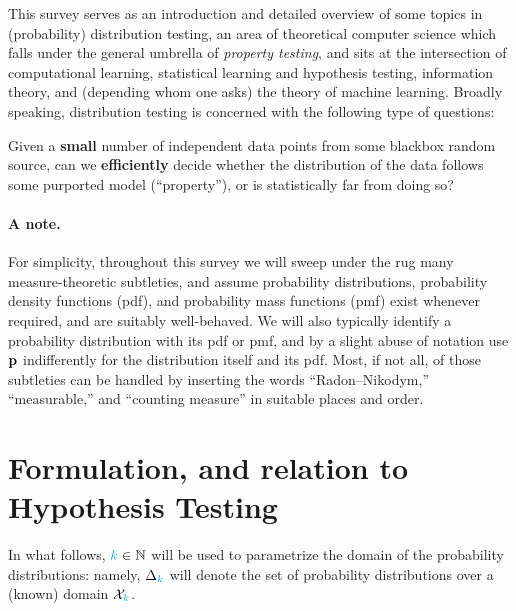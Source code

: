 This survey serves as an introduction and detailed overview of some topics in (probability) distribution testing, an area of theoretical computer science which falls under the general umbrella of \emph{property testing}, and sits at the intersection of computational learning, statistical learning and hypothesis testing, information theory, and (depending whom one asks) the theory of machine learning. Broadly speaking, distribution testing is concerned with the following type of questions: 
\begin{framed}
 Given a \textbf{small} number of independent data points from some blackbox random source, can we \textbf{efficiently} decide whether the distribution of the data follows some purported model (``property''), or is statistically far from doing so?
\end{framed}

\tbc

\paragraph{A note.} For simplicity, throughout this survey we will sweep under the rug many measure-theoretic subtleties, and assume probability distributions, probability density functions (pdf), and probability mass functions (pmf) exist whenever required, and are suitably well-behaved. We will also typically identify a probability distribution with its pdf or pmf, and by a slight abuse of notation use $\mathbf{p}$ indifferently for the distribution itself and its pdf. Most, if not all, of those subtleties can be handled by inserting the words ``Radon--Nikodym,'' ``measurable,'' and ``counting measure'' in suitable places and order.

\section{Formulation, and relation to Hypothesis Testing}


In what follows, ${\textcolor{cyan}{k}}\in\mathbb{N}$ will be used to parametrize the domain of the probability distributions: namely, $\Delta_{{\textcolor{cyan}{k}}}$ will denote the set of probability distributions over a (known) domain $\mathcal{X}_{\textcolor{cyan}{k}}$.

